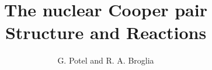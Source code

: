 \documentclass[a4paper,11pt]{book}
\title{The nuclear Cooper pair\\\large Structure and Reactions}
\author{G. Potel and R. A. Broglia}
\numberwithin{equation}{section}
\numberwithin{figure}{section}
\numberwithin{table}{section}
\begin{document}
\maketitle
% 

%
\tableofcontents
\setcounter{chapter}{0}


%

%

%

%

%


\renewcommand{\bibname}{Bibliography}

\end{document}

